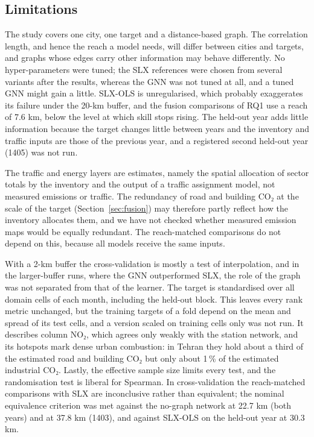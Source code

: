 \documentclass[pdflatex,sn-basic]{sn-jnl}
\begin{document}
\subsection{Limitations}\label{sec:limitations}

The study covers one city, one target and a distance-based graph. The correlation length, and hence the reach a model needs, will differ between cities and targets, and graphs whose edges carry other information may behave differently. No hyper-parameters were tuned; the SLX references were chosen from several variants after the results, whereas the GNN was not tuned at all, and a tuned GNN might gain a little. SLX-OLS is unregularised, which probably exaggerates its failure under the 20-km buffer, and the fusion comparisons of RQ1 use a reach of 7.6 km, below the level at which skill stops rising. The held-out year adds little information because the target changes little between years and the inventory and traffic inputs are those of the previous year, and a registered second held-out year (1405) was not run.

The traffic and energy layers are estimates, namely the spatial allocation of sector totals by the inventory and the output of a traffic assignment model, not measured emissions or traffic. The redundancy of road and building CO₂ at the scale of the target (Section~\ref{sec:fusion}) may therefore partly reflect how the inventory allocates them, and we have not checked whether measured emission maps would be equally redundant. The reach-matched comparisons do not depend on this, because all models receive the same inputs.

With a 2-km buffer the cross-validation is mostly a test of interpolation, and in the larger-buffer runs, where the GNN outperformed SLX, the role of the graph was not separated from that of the learner. The target is standardised over all domain cells of each month, including the held-out block. This leaves every rank metric unchanged, but the training targets of a fold depend on the mean and spread of its test cells, and a version scaled on training cells only was not run. It describes column NO₂, which agrees only weakly with the station network, and its hotspots mark dense urban combustion: in Tehran they hold about a third of the estimated road and building CO₂ but only about 1\,\% of the estimated industrial CO₂. Lastly, the effective sample size limits every test, and the randomisation test is liberal for Spearman. In cross-validation the reach-matched comparisons with SLX are inconclusive rather than equivalent; the nominal equivalence criterion was met against the no-graph network at 22.7 km (both years) and at 37.8 km (1403), and against SLX-OLS on the held-out year at 30.3 km.
\end{document}
